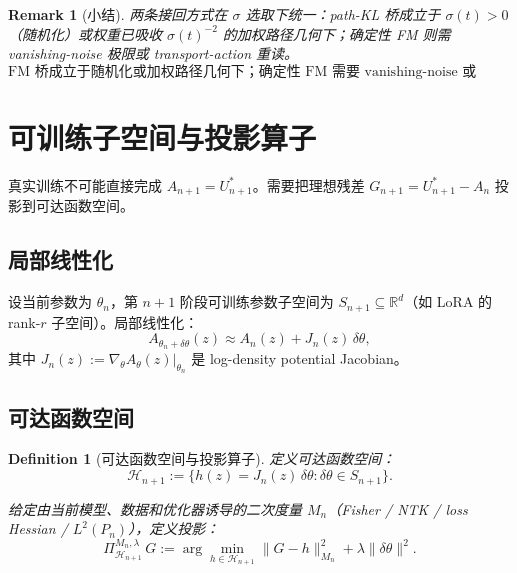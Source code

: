 \documentclass[11pt,a4paper]{article}
\newtheorem{definition}[theorem]{Definition}
\newtheorem{remark}[theorem]{Remark}
\newcommand{\R}{\mathbb{R}}
\newcommand{\cH}{\mathcal{H}}
\newcommand{\ProjectOp}{\Pi}
\begin{document}
\begin{remark}[小结]
两条接回方式在 $\sigma$ 选取下统一：path-KL 桥成立于 $\sigma(t)>0$（随机化）或权重已吸收 $\sigma(t)^{-2}$ 的加权路径几何下；确定性 FM 则需 vanishing-noise 极限或 transport-action 重读。
\[
\boxed{
\text{FM 桥成立于随机化或加权路径几何下；确定性 FM 需要 vanishing-noise 或 transport-action 解释。}
}
\]
\end{remark}

\section{可训练子空间与投影算子}
\label{sec:projection}

真实训练不可能直接完成 $A_{n+1} = U_{n+1}^*$。需要把理想残差 $G_{n+1} = U_{n+1}^* - A_n$ 投影到可达函数空间。

\subsection{局部线性化}

设当前参数为 $\theta_n$，第 $n{+}1$ 阶段可训练参数子空间为 $S_{n+1} \subseteq \R^d$（如 LoRA 的 rank-$r$ 子空间）。局部线性化：
\begin{equation}\label{eq:linearize}
A_{\theta_n + \delta\theta}(z) \approx A_n(z) + J_n(z)\,\delta\theta,
\end{equation}
其中 $J_n(z) := \nabla_\theta A_\theta(z)\big|_{\theta_n}$ 是 log-density potential Jacobian。

\subsection{可达函数空间}

\begin{definition}[可达函数空间与投影算子]
定义可达函数空间：
\begin{equation}\label{eq:reachable}
\cH_{n+1} := \{h(z) = J_n(z)\,\delta\theta : \delta\theta \in S_{n+1}\}.
\end{equation}

给定由当前模型、数据和优化器诱导的二次度量 $M_n$（Fisher / NTK / loss Hessian / $L^2(P_n)$），定义投影：
\begin{equation}\label{eq:projection}
\ProjectOp_{\cH_{n+1}}^{M_n,\lambda}\,G := \arg\min_{h \in \cH_{n+1}} \|G - h\|_{M_n}^2 + \lambda\|\delta\theta\|^2.
\end{equation}
\end{definition}
\end{document}
